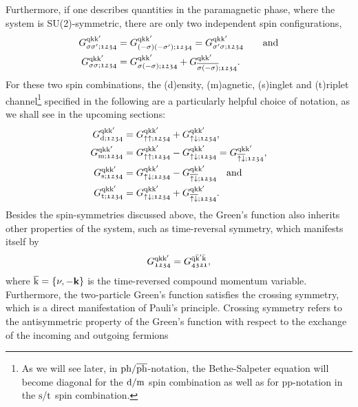 \documentclass[../../main.tex]{subfiles}
\begin{document}
Furthermore, if one describes quantities in the paramagnetic phase, where the system is SU(2)-symmetric, there are only two independent spin configurations,
\begin{subequations}
\begin{align}
	G_{\sigma\sigma';\mathfrak{1234}}^{\text{q}\text{k}\text{k}'}&=G_{(-\sigma)(-\sigma');\mathfrak{1234}}^{\text{q}\text{k}\text{k}'}=G_{\sigma'\sigma;\mathfrak{1234}}^{\text{q}\text{k}\text{k}'}\qquad\text{and}\\
	G_{\sigma\sigma;\mathfrak{1234}}^{\text{q}\text{k}\text{k}'}&=G_{\sigma(-\sigma);\mathfrak{1234}}^{\text{q}\text{k}\text{k}'}+G_{\overline{\sigma(-\sigma)};\mathfrak{1234}}^{\text{q}\text{k}\text{k}'}.
\end{align}
\end{subequations}
For these two spin combinations, the (d)ensity, (m)agnetic, (s)inglet and (t)riplet channel\footnote{As we will see later, in $\text{ph}/\overline{\text{ph}}$-notation, the Bethe-Salpeter equation will become diagonal for the $\text{d}/\text{m}$ spin combination as well as for pp-notation in the $\text{s}/\text{t}$ spin combination.} specified in the following are a particularly helpful choice of notation, as we shall see in the upcoming sections: 
\begin{subequations}
\begin{align}
	G_{\text{d};\mathfrak{1234}}^{\text{q}\text{k}\text{k}'}&=G_{\uparrow\uparrow;\mathfrak{1234}}^{\text{q}\text{k}\text{k}'}+G_{\uparrow\downarrow;\mathfrak{1234}}^{\text{q}\text{k}\text{k}'},\label{eq:two_particle_green_density}\\
	G_{\text{m};\mathfrak{1234}}^{\text{q}\text{k}\text{k}'}&=G_{\uparrow\uparrow;\mathfrak{1234}}^{\text{q}\text{k}\text{k}'}-G_{\uparrow\downarrow;\mathfrak{1234}}^{\text{q}\text{k}\text{k}'}=G_{\overline{\uparrow\downarrow};\mathfrak{1234}}^{\text{q}\text{k}\text{k}'},\\
	G_{\text{s};\mathfrak{1234}}^{\text{q}\text{k}\text{k}'}&=G^{\text{q}\text{k}\text{k}'}_{\uparrow\downarrow;\mathfrak{1234}}-G^{\text{q}\text{k}\text{k}'}_{\overline{\uparrow\downarrow};\mathfrak{1234}}\quad\text{and}\\
	G_{\text{t};\mathfrak{1234}}^{\text{q}\text{k}\text{k}'}&=G^{\text{q}\text{k}\text{k}'}_{\uparrow\downarrow;\mathfrak{1234}}+G^{\text{q}\text{k}\text{k}'}_{\overline{\uparrow\downarrow};\mathfrak{1234}}.
\label{eq:two_particle_green_magnetic}
\end{align}
\end{subequations}
Besides the spin-symmetries discussed above, the Green's function also inherits other properties of the system, such as time-reversal symmetry, which manifests itself by
\begin{align}
	G_{\mathfrak{1234}}^{\text{q}\text{k}\text{k}'}=G_{\mathfrak{4321}}^{\bar{\text{q}}\bar{\text{k}}'\bar{\text{k}}},
\end{align} 
where $\overline{\text{k}}=\{\nu,-\textbf{k}\}$ is the time-reversed compound momentum variable. Furthermore, the two-particle Green's function satisfies the crossing symmetry, which is a direct manifestation of Pauli's principle. Crossing symmetry refers to the antisymmetric property of the Green's function with respect to the exchange of the incoming and outgoing fermions
\end{document}

